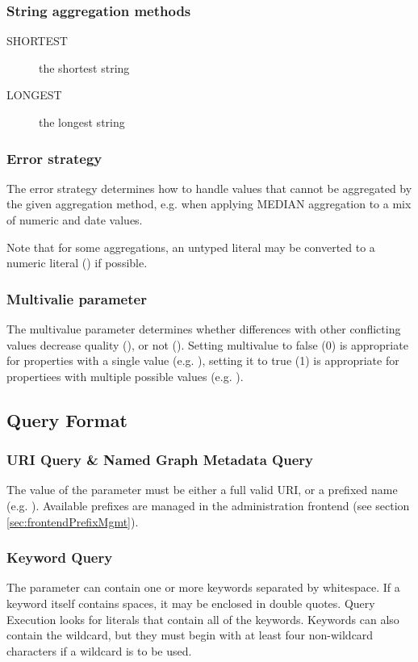 \subsubsection*{String aggregation methods}

\begin{description}
	\item[SHORTEST]
		the shortest string
	\item[LONGEST]
		the longest string
\end{description}

\subsubsection*{Error strategy}
The error strategy determines how to handle values that cannot be aggregated by the given aggregation method, e.g. when applying MEDIAN aggregation to a mix of numeric and date values.

Note that for some aggregations, an untyped literal may be converted to a numeric literal () if possible.

\subsubsection*{Multivalie parameter}
The multivalue parameter determines whether differences with other conflicting values decrease quality (), or not (). Setting multivalue to false (0) is appropriate for properties with a single value (e.g. ), setting it to true (1) is appropriate for propertiees with multiple possible values (e.g. ).


\subsection{Query Format}

\subsubsection{URI Query \& Named Graph Metadata Query}
The value of the  parameter must be either a full valid URI, or a prefixed name (e.g. ).  Available prefixes are managed in the administration frontend (see section \ref{sec:frontendPrefixMgmt}).

\subsubsection{Keyword Query}
The  parameter can contain one or more keywords separated by whitespace. If a keyword itself contains spaces, it may be enclosed in double quotes. Query Execution looks for literals that contain all of the keywords. Keywords can also contain the \code{*} wildcard, but they must begin with at least four non-wildcard characters if a wildcard is to be used.

